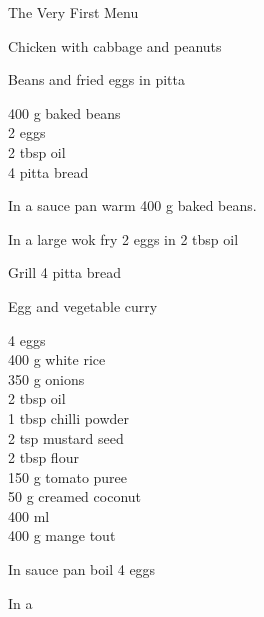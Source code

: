 \begin{menu}{The Very First Menu}
\begin{recipe}{2}{Chicken with cabbage and peanuts}
\begin{instructions}
    \end{instructions}
    \end{recipe}%
  
    \begin{recipe}{1}{Beans and fried eggs in pitta}%
    
		\begin{ingredients}
		400 g baked beans  \\
	2  eggs  \\
	2 tbsp oil  \\
	4  pitta bread  \\
	
		\end{ingredients}
	
    \begin{instructions}
    \item 
				In a sauce pan warm
				400 g  baked beans.
			\item 
				In a large wok fry
				2   eggs
				in 
				2 tbsp  oil\item 
				Grill
				4   pitta bread
    \end{instructions}
    \end{recipe}%
  
    \begin{recipe}{2}{Egg and vegetable curry}%
    
	
		\begin{ingredients}
		4  eggs  \\
	400 g white rice  \\
	350 g onions  \\
	2 tbsp oil  \\
	1 tbsp chilli powder  \\
	2 tsp mustard seed  \\
	2 tbsp flour  \\
	150 g tomato puree  \\
	50 g creamed coconut  \\
	400 ml   \\
	400 g mange tout  \\
	
		\end{ingredients}
	
    \begin{instructions}
    \item 
				In sauce pan boil
				4   eggs\item 
      In a 
       

\end{instructions}
\end{recipe}
\end{menu}
